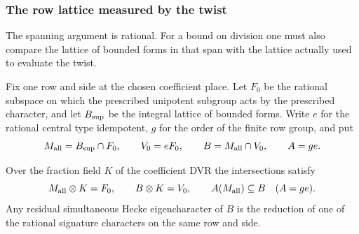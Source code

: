 \subsubsection*{The row lattice measured by the twist}
\label{subsec:twist-row-lattices}

The spanning argument is rational. For a bound on division one must also compare the lattice of bounded forms in that span with the lattice actually used to evaluate the twist.

Fix one row and side at the chosen coefficient place. Let
\(F_0\) be the rational subspace on which the prescribed
unipotent subgroup acts by the prescribed character, and
let \(B_{\rm sup}\) be the integral lattice of bounded
forms. Write \(e\) for the rational central type idempotent,
\(g\) for the order of the finite row group, and put
\[
 M_{\rm all}=B_{\rm sup}\cap F_0,\qquad V_0=eF_0,\qquad
 B=M_{\rm all}\cap V_0,\qquad A=ge .
\]
\begin{lemma}
\label{lem:projected-row-type}
Over the fraction field \(K\) of the coefficient DVR the intersections satisfy
\[
 M_{\rm all}\otimes K=F_0,\qquad B\otimes K=V_0,\qquad A(M_{\rm all})\subseteq B\quad(A=ge).
\] Any residual
simultaneous Hecke eigencharacter of \(B\) is the reduction of
one of the rational signature characters on the same row
and side.
\end{lemma}

